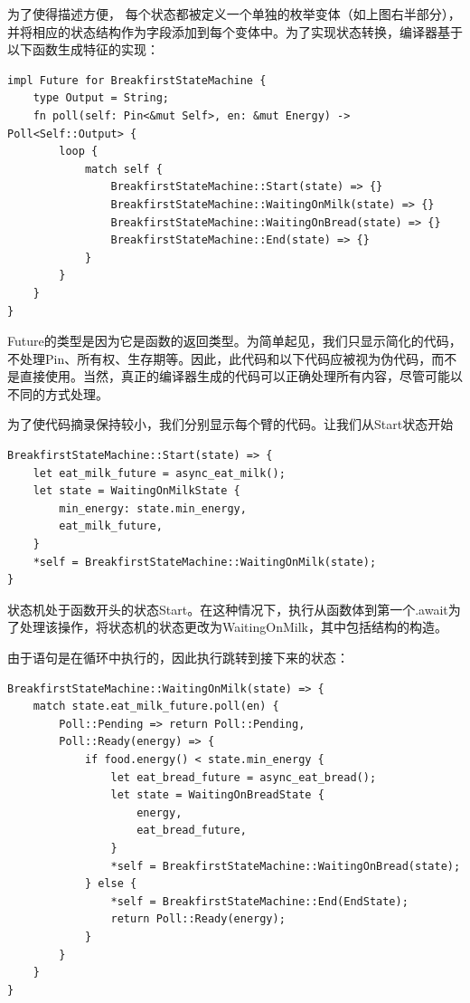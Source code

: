 为了使得描述方便， 每个状态都被定义一个单独的枚举变体（如上图右半部分），并将相应的状态结构作为字段添加到每个变体中。为了实现状态转换，编译器基于以下函数生成特征的实现：

\begin{lstlisting}[caption=Breakfirst的状态转换]
impl Future for BreakfirstStateMachine {
    type Output = String;
    fn poll(self: Pin<&mut Self>, en: &mut Energy) -> Poll<Self::Output> {
        loop {
            match self {
                BreakfirstStateMachine::Start(state) => {}
                BreakfirstStateMachine::WaitingOnMilk(state) => {}
                BreakfirstStateMachine::WaitingOnBread(state) => {}
                BreakfirstStateMachine::End(state) => {}
            }
        }
    }
}
\end{lstlisting}

Future的类型是因为它是函数的返回类型。为简单起见，我们只显示简化的代码，不处理Pin、所有权、生存期等。因此，此代码和以下代码应被视为伪代码，而不是直接使用。当然，真正的编译器生成的代码可以正确处理所有内容，尽管可能以不同的方式处理。


为了使代码摘录保持较小，我们分别显示每个臂的代码。让我们从Start状态开始

\begin{lstlisting}[caption = Start Branch]
BreakfirstStateMachine::Start(state) => {
    let eat_milk_future = async_eat_milk();
    let state = WaitingOnMilkState {
        min_energy: state.min_energy,
        eat_milk_future,
    }
    *self = BreakfirstStateMachine::WaitingOnMilk(state);
}
\end{lstlisting}

状态机处于函数开头的状态Start。在这种情况下，执行从函数体到第一个.await为了处理该操作，将状态机的状态更改为WaitingOnMilk，其中包括结构的构造。


由于语句是在循环中执行的，因此执行跳转到接下来的状态：

\begin{lstlisting}[caption=WaitingOnMilk Branch]
BreakfirstStateMachine::WaitingOnMilk(state) => {
    match state.eat_milk_future.poll(en) {
        Poll::Pending => return Poll::Pending,
        Poll::Ready(energy) => {
            if food.energy() < state.min_energy {
                let eat_bread_future = async_eat_bread();
                let state = WaitingOnBreadState {
                    energy,
                    eat_bread_future,
                }
                *self = BreakfirstStateMachine::WaitingOnBread(state);
            } else {
                *self = BreakfirstStateMachine::End(EndState);
                return Poll::Ready(energy);
            }
        }
    }
}
\end{lstlisting}


